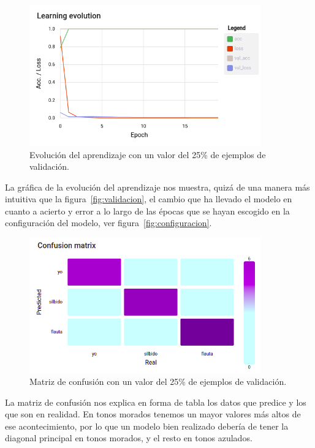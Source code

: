 \documentclass[a4paper, 12pt]{book}
\begin{document}
\begin{figure}
	\centering
	\includegraphics[width=10cm, keepaspectratio]{img/learning-evolution-25.png}
	\caption{Evolución del aprendizaje con un valor del 25\% de ejemplos de validación.}\label{fig:learning-evolution}
\end{figure}

La gráfica de la evolución del aprendizaje nos muestra, quizá de una manera más intuitiva que la figura~\ref{fig:validacion}, el cambio que ha llevado el modelo en cuanto a acierto y error a lo largo de las épocas que se hayan escogido en la configuración del modelo, ver figura~\ref{fig:configuracion}.

\begin{figure}
	\centering
	\includegraphics[width=10cm, keepaspectratio]{img/confusion-matrix-25.png}
	\caption{Matriz de confusión con un valor del 25\% de ejemplos de validación.}\label{fig:matriz-confusion}
\end{figure}

La matriz de confusión nos explica en forma de tabla los datos que predice y los que son en realidad. En tonos morados tenemos un mayor valores más altos de ese acontecimiento, por lo que un modelo bien realizado debería de tener la diagonal principal en tonos morados, y el resto en tonos azulados.

\end{document}
